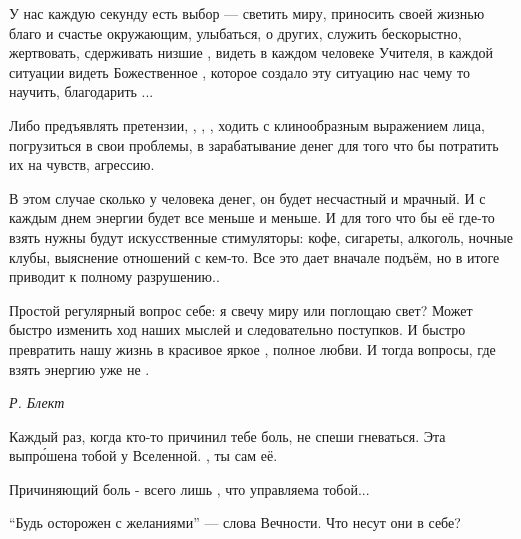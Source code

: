 У нас каждую секунду есть выбор --- светить миру, приносить своей жизнью благо и счастье окружающим, улыбаться,  о других, служить бескорыстно, жертвовать, сдерживать низшие , видеть в каждом человеке Учителя, в каждой ситуации видеть Божественное , которое создало эту ситуацию  нас чему то научить, благодарить ...

Либо предъявлять претензии, , , , ходить с клинообразным выражением лица, погрузиться в свои проблемы, в зарабатывание денег для того что бы потратить их на  чувств,  агрессию.

В этом случае  сколько у человека денег, он будет несчастный и мрачный. И с каждым днем энергии будет все меньше и меньше. И для того что бы её где-то взять нужны будут искусственные стимуляторы: кофе, сигареты, алкоголь, ночные клубы, выяснение отношений с кем-то. Все это дает вначале подъём, но в итоге приводит к полному разрушению..

Простой регулярный вопрос себе: я свечу миру или поглощаю свет? Может быстро изменить ход наших мыслей и следовательно поступков. И быстро превратить нашу жизнь в красивое яркое , полное любви. И тогда вопросы, где взять энергию уже не .

\begin{flushright}
    \it Р. Блект
\end{flushright}


Каждый раз, когда кто-то причинил тебе боль, не спеши гневаться. Эта  выпр\'{о}шена тобой у Вселенной. , ты сам  её.

Причиняющий боль - всего лишь , что управляема тобой...

``Будь осторожен с желаниями'' --- слова Вечности. Что несут они в себе?

